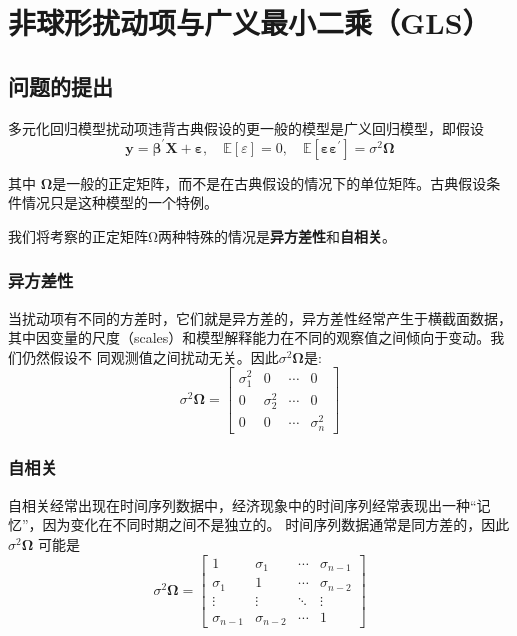 
\chapter{非球形扰动项与广义最小二乘（GLS）}

\section{问题的提出}

多元化回归模型扰动项违背古典假设的更一般的模型是广义回归模型，即假设
\begin{equation}
    \boldsymbol{ y=\beta^{\prime} X +\varepsilon }, \quad \mathbb{E}[\varepsilon]=0, \quad \mathbb{E}
    \left[ \boldsymbol{\varepsilon \varepsilon^{\prime}}\right]=\sigma^{2} \boldsymbol{\Omega}
    \label{eq 10.1.1}
\end{equation}

其中 $ \boldsymbol{\Omega} $是一般的正定矩阵，而不是在古典假设的情况下的单位矩阵。古典假设条件情况只是这种模型的一个特例。

我们将考察的正定矩阵Ω两种特殊的情况是{\bf 异方差性}和{\bf 自相关}。

\subsection{异方差性}

    当扰动项有不同的方差时，它们就是异方差的，异方差性经常产生于横截面数据，其中因变量的尺度（scales）和模型解释能力在不同的观察值之间倾向于变动。我们仍然假设不
    同观测值之间扰动无关。因此$ \sigma^{2} \boldsymbol{\Omega} $是:
    $$ \sigma^{2} \boldsymbol{\Omega} = 
    \left[\begin{array}{cccc}
        \sigma_{1}^{2} & 0 & \cdots & 0 \\
        0 & \sigma_{2}^{2} & \cdots & 0 \\
        0 & 0 & \cdots & \sigma_{n}^{2}
        \end{array}\right] $$

\subsection{自相关}
    自相关经常出现在时间序列数据中，经济现象中的时间序列经常表现出一种“记忆”，因为变化在不同时期之间不是独立的。
    时间序列数据通常是同方差的，因此$ \sigma^{2} \boldsymbol{\Omega} $ 可能是
    $$ \sigma^{2} \boldsymbol{\Omega} =\left[\begin{array}{cccc}
        1 & \sigma_{1} & \cdots & \sigma_{n-1} \\
        \sigma_{1} & 1 & \cdots & \sigma_{n-2} \\
        \vdots& \vdots & \ddots & \vdots  \\
        \sigma_{n-1} & \sigma_{n-2} & \cdots &  1
        \end{array}\right] $$

